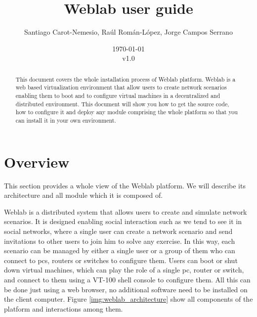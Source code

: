 \documentclass{article}
\begin{document}
\title{Weblab user guide}
\author{Santiago Carot-Nemesio, Raúl Román-López, Jorge Campos Serrano}
\date{\today\\v1.0}

\maketitle

\tableofcontents

\newpage

\begin{abstract}
This document covers the whole installation process of Weblab platform. Weblab is a web based virtualization environment that allow users to create network scenarios enabling them to boot and to configure virtual machines in a decentralized and distributed environment. This document will show you how to get the source code, how to configure it and deploy any module comprising the whole platform so that you can install it in your own environment.
\end{abstract}

\section{Overview}
This section provides a whole view of the Weblab platform. We will describe its architecture and all module which it is composed of.

Weblab is a distributed system that allows users to create and simulate network scenarios. It is designed enabling social interaction such as we tend to see it in social networks, where a single user can create a network scenario and send invitations to other users to join him to solve any exercise. In this way, each scenario can be managed by either a single user or a group of them who can connect to pcs, routers or switches to configure them. Users can boot or shut down virtual machines, which can play the role of a single pc, router or switch, and connect to them using a VT-100 shell console to configure them. All this can be done just using a web browser, no additional software need to be installed on the client computer. Figure \ref{img:weblab_architecture} show all components of the platform and interactions among them.
\end{document}
